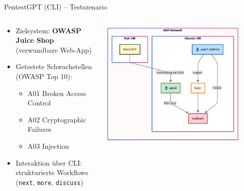 \documentclass[
	aspectratio=169,	%
	onlytextwidth,		%
	t,					%
	]{beamer}
\begin{document}
\begin{frame}{PentestGPT (CLI) – Testszenario}
	\begin{columns}
		\begin{column}[T]{.45\textwidth}
			\begin{itemize}
				\item Zielsystem: \textbf{OWASP Juice Shop} (verwundbare Web-App)
				\item Getestete Schwachstellen (OWASP Top 10):
				\begin{itemize}
					\item A01 Broken Access Control 
					\item A02 Cryptographic Failures 
					\item A03 Injection 
				\end{itemize}
				\item Interaktion über CLI: strukturierte Workflows 
				(\texttt{next}, \texttt{more}, \texttt{discuss})
			\end{itemize}
		\end{column}
		\begin{column}[T]{.55\textwidth}
			\centering
			\vspace{-4mm}
			\includegraphics[width=0.9\textwidth]{figures/14.png}
			\label{fig:14}
		\end{column}
	\end{columns}
\end{frame}
\end{document}
